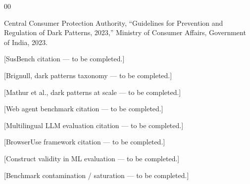 \documentclass[conference]{IEEEtran}
\begin{document}
\begin{thebibliography}{00}

 Central Consumer Protection Authority, ``Guidelines
for Prevention and Regulation of Dark Patterns, 2023,'' Ministry of
Consumer Affairs, Government of India, 2023.

 [SusBench citation --- to be completed.]

 [Brignull, dark patterns taxonomy --- to be
completed.]

 [Mathur et al., dark patterns at scale --- to be
completed.]

 [Web agent benchmark citation --- to be
completed.]

 [Multilingual LLM evaluation citation --- to be
completed.]

 [BrowserUse framework citation --- to be
completed.]

 [Construct validity in ML evaluation --- to be
completed.]

 [Benchmark contamination / saturation ---
to be completed.]

\end{thebibliography}
\end{document}
